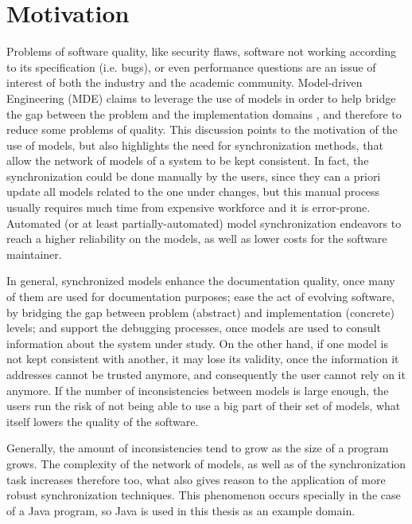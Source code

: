 \documentclass[tuberlin,cic,tc,english,noabntcite]{iiufrgs}
\begin{document}
\section{Motivation}
Problems of software quality, like security flaws, software not working according to its specification (i.e. bugs), or even performance questions are an issue of interest of both the industry and the academic community. Model-driven Engineering (MDE) claims to leverage the use of models in order to help bridge the gap between the problem and the implementation domains \citep{france2007model}, and therefore to reduce some problems of quality. This discussion points to the motivation of the use of models, but also highlights the need for synchronization methods, that allow the network of models of a system to be kept consistent. In fact, the synchronization could be done manually by the users, since they can a priori update all models related to the one under changes, but this manual process usually requires much time from expensive workforce and it is error-prone. Automated (or at least partially-automated) model synchronization endeavors to reach a higher reliability on the models, as well as lower costs for the software maintainer.

In general, synchronized models enhance the documentation quality, once many of them are used for documentation purposes; ease the act of evolving software, by bridging the gap between problem (abstract) and implementation (concrete) levels; and support the debugging processes, once models are used to consult information about the system under study. On the other hand, if one model is not kept consistent with another, it may lose its validity, once the information it addresses cannot be trusted anymore, and consequently the user cannot rely on it anymore. If the number of inconsistencies between models is large enough, the users run the risk of not being able to use a big part of their set of models, what itself lowers the quality of the software.

Generally, the amount of inconsistencies tend to grow as the size of a program grows. The complexity of the network of models, as well as of the synchronization task increases therefore too, what also gives reason to the application of more robust synchronization techniques. This phenomenon occurs specially in the case of a Java program, so Java is used in this thesis as an example domain.
\end{document}
